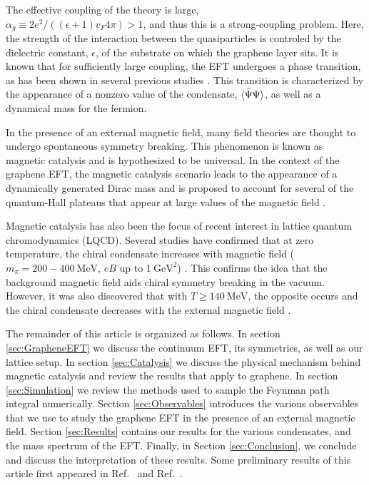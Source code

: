 \documentclass[aps,prd,twocolumn,showpacs,superscriptaddress,groupedaddress]{revtex4}  %
\begin{document}
The effective coupling of the theory is large, \\ $\alpha_g \equiv 2e^2/((\epsilon+1) v_F 4\pi) > 1$, and thus this is a strong-coupling problem. Here, the strength of the interaction between the quasiparticles is controled by the dielectric constant, $\epsilon$, of the substrate on which the graphene layer sits. It is known that for sufficiently large coupling, the EFT undergoes a phase transition, as has been shown in 
several previous studies \cite{Drut1, Drut2, Hands1, Hands2}. This transition is characterized by the appearance of a nonzero value of the condensate, ${\langle {\bar \Psi} \Psi \rangle}$, as well as a dynamical mass
for the fermion.

In the presence of an external magnetic field, many field theories are thought to undergo spontaneous symmetry breaking. This phenomenon is known as magnetic catalysis and is hypothesized to be universal. In the context of the graphene EFT, the magnetic
catalysis scenario leads to the appearance of a dynamically generated Dirac mass and is proposed to account for several of the quantum-Hall plateaus that appear at large values of the magnetic field \cite{ZhangQHE,JiangQHE, Kennett}.

Magnetic catalysis has also been the focus of recent interest in lattice quantum chromodynamics (LQCD). Several studies have confirmed that at zero temperature, the chiral condensate
increases with magnetic field ($m_{\pi} = 200-400 ~\text{MeV}$, $eB$ up to $1 ~\text{GeV}^2$) \cite{Buividovich,Braguta,Cohen}. This confirms the idea that the background magnetic field aids chiral symmetry breaking in the vacuum.
However, it was also discovered that with $T \geq 140 ~\text{MeV}$, the opposite occurs and the chiral condensate decreases with the external magnetic field \cite{Bali1,DElia,Bali2}.

The remainder of this article is organized as follows. In section \ref{sec:GrapheneEFT} we discuss the continuum EFT, its symmetries, as well as our lattice setup.
In section \ref{sec:Catalysis} we discuss the physical mechanism behind magnetic catalysis and review the results that apply to graphene. In section \ref{sec:Simulation} we review the methods used to sample the Feynman path integral numerically. Section \ref{sec:Observables} introduces the various observables that we use to study the graphene EFT in the presence of an external magnetic field. Section \ref{sec:Results} contains our results for the various condensates, and the mass spectrum of the EFT.
Finally, in Section \ref{sec:Conclusion}, we conclude and discuss the interpretation of these results. Some preliminary results of this article first appeared in Ref.~\cite{DPF2015} and Ref.~\cite{GrapheneLetter}.
\end{document}
